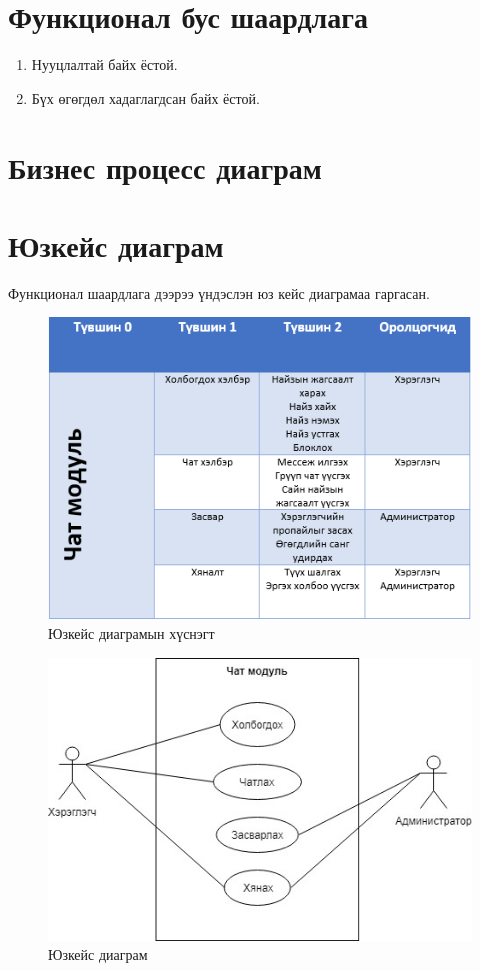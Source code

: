 \section{Функционал бус шаардлага}
\begin{enumerate}
	\item Нууцлалтай байх ёстой.
	\item Бүх өгөгдөл хадаглагдсан байх ёстой.
\end{enumerate}

\section{Бизнес процесс диаграм}


\section{Юзкейс диаграм}
Функционал шаардлага дээрээ үндэслэн юз кейс диаграмаа гаргасан.
\begin{figure}[htbp]
	\centering
	\includegraphics[scale=0.9]{Chart/Chart9}
	\caption[Юзкейс диаграм]{Юзкейс диаграмын хүснэгт}
	\label{fit:UseCase}
\end{figure}
\begin{figure}[htbp]
	\centering
	\includegraphics[scale=0.6]{Diagrams/UseCaseMain}
	\caption[Юзкейс диаграм]{Юзкейс диаграм}
	\label{fit:UseCase}
\end{figure}
